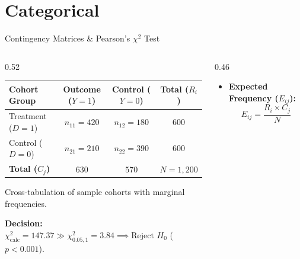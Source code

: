 \documentclass[aspectratio=169, 9pt]{beamer}
\begin{document}
\section{Categorical}
\begin{frame}{Contingency Matrices \& Pearson's $\chi^2$ Test}
    \begin{columns}[c]
        \begin{column}{0.52\textwidth}
            \centering
            \setlength{\tabcolsep}{4.5pt}
            \scriptsize
            \begin{tabular}{@{} l c c c @{}}
                \toprule
                \rowcolor{tableheader}
                \textbf{Cohort Group} & \textbf{Outcome ($Y=1$)} & \textbf{Control ($Y=0$)} & \textbf{Total ($R_i$)} \\
                \midrule
                Treatment ($D=1$)  & $n_{11} = 420$          & $n_{12} = 180$          & $600$ \\
                Control ($D=0$)    & $n_{21} = 210$          & $n_{22} = 390$          & $600$ \\
                \midrule
                \textbf{Total ($C_j$)} & $630$              & $570$              & $N = 1{,}200$ \\
                \bottomrule
            \end{tabular}
            \par\vspace{4pt}
            {\tiny\textcolor{structure!70}{Cross-tabulation of sample cohorts with marginal frequencies.}}
            \vspace{0.4em}
            \begin{takeaway}
                \textbf{Decision:} $\chi^2_{\mathrm{calc}} = 147.37 \gg \chi^2_{0.05, 1} = 3.84 \implies \text{Reject } H_0$ ($p < 0.001$).
            \end{takeaway}
        \end{column}
        \begin{column}{0.46\textwidth}
            \par\vspace{0.2em}
            \scriptsize
            \begin{itemize}\setlength{\itemsep}{2pt}
                \item \textbf{Expected Frequency ($E_{ij}$):}
                \begin{equation*}
                    E_{ij} = \frac{R_i \times C_j}{N}

\end{equation*}
\end{itemize}
\end{column}
\end{columns}
\end{frame}
\end{document}
